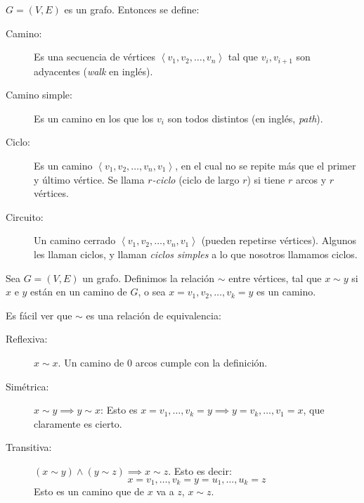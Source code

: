   \begin{definition}
    \(G = (V,E)\) es un grafo.
    Entonces se define:
    \begin{description}
      \item[Camino:]
	Es una secuencia de vértices
	  \(\left\langle v_1, v_2, \dots, v_n \right\rangle\)
	tal que \(v_i, v_{i + 1}\) son adyacentes
	(\emph{\foreignlanguage{english}{walk}} en inglés).
      \item[Camino simple:]
	Es un camino en los que los \(v_i\) son todos distintos
	(en inglés, \emph{\foreignlanguage{english}{path}}).
      \item[Ciclo:]
	Es un camino
	  \(\left\langle v_1, v_2, \dots, v_n, v_1 \right\rangle\),
	en el cual no se repite más que el primer y último vértice.
	Se llama \emph{\(r\)\nobreakdash-ciclo}
	(ciclo de largo \(r\))
	si tiene \(r\) arcos y \(r\) vértices.
      \item[Circuito:]
	Un camino cerrado
	\(\left\langle v_1, v_2, \dots, v_n, v_1 \right\rangle\)
	(pueden repetirse vértices).
	Algunos les llaman ciclos,
	y llaman \emph{ciclos simples}
	a lo que nosotros llamamos ciclos.
    \end{description}
  \end{definition}

  \begin{definition}
    Sea \(G = (V,E)\) un grafo.
    Definimos la relación \(\sim\) entre vértices,
    tal que \(x \sim y\) si \(x\) e \(y\)
    están en un camino de \(G\),
    o sea \(x = v_1, v_2, \dots, v_k = y\) es un camino.
  \end{definition}

  Es fácil ver que \(\sim\) es una relación de equivalencia:
  \begin{description}
  \item[Reflexiva:]
    \(x \sim x\).
    Un camino de \(0\) arcos cumple con la definición.
  \item[Simétrica:]
    \(x \sim y \implies y \sim x\):
    Esto es
    \(x = v_1, \dots, v_k = y \implies y = v_k, \dots, v_1 = x\),
    que claramente es cierto.
  \item[Transitiva:]
    \((x \sim y) \wedge (y \sim z) \implies x \sim z\).
    Esto es decir:
    \begin{equation*}
      x = v_1, \dots, v_k = y = u_1, \dots, u_k = z
    \end{equation*}
    Esto es un camino que de \(x\) va a \(z\),
    \(x \sim z\).
  \end{description}

